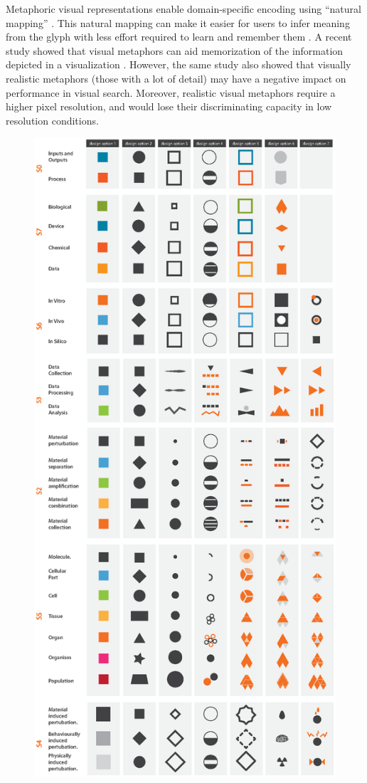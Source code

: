 Metaphoric visual representations enable domain-specific encoding using ``natural mapping'' \cite{siirtola05,norman02}. This natural mapping can make it easier for users to infer meaning from the glyph with less effort required to learn and remember them \cite{McDougall00}.
A recent study showed that visual metaphors can aid memorization of the information depicted in a visualization \cite{Borgo12}. However, the same study also showed that visually realistic metaphors 
(those with a lot of detail) may have a negative impact on performance in visual search. Moreover, realistic visual metaphors require a higher pixel resolution, and would lose their discriminating capacity in low resolution conditions. 

\begin{figure}[t!]
\centering
\includegraphics[scale=0.605]{images/glyph-taxonomy/design-options.eps}

\end{figure}
